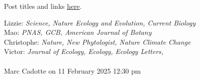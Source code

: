 \documentclass[11pt]{article}
\begin{document}
\vspace{6pt}
  Post titles and links \href{https://docs.google.com/document/d/1j0WdDbjdp8ERLSO7whvtnP-tOblYMlX33TSCXy_uRKo/edit?usp=sharing}{\underline{here}}. 

Lizzie: \emph{Science, Nature Ecology and Evolution, Current Biology}\\
Mao: \emph{PNAS, GCB, American Journal of Botany}\\
Christophe: \emph{Nature, New Phytologist, Nature Climate Change}\\
Victor: \emph{Journal of Ecology, Ecology, Ecology Letters,}\\


\vspace{6pt}
 \\
Marc Cadotte on 11 February 2025 12:30 pm 
\end{document}
